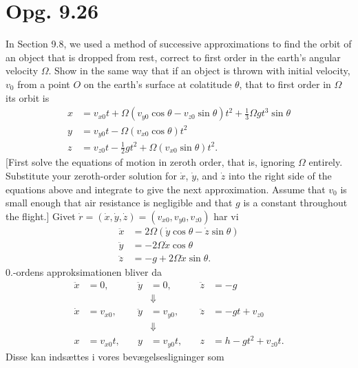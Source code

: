 \documentclass[12pt]{article}
\theoremstyle{definition}
\begin{document}
\section*{Opg. 9.26}
In Section 9.8, we used a method of successive approximations to find the orbit of an object that is dropped from rest, correct to first order in the earth's angular velocity $\Omega$. Show in the same way that if an object is thrown with initial velocity, $v_0$ from a point $O$ on the earth's surface at colatitude $\theta$, that to first order in $\Omega$ its orbit is
\begin{align*}
  x &= v_{x0}t + \Omega(v_{y0} \cos \theta - v_{z0} \sin\theta)t^2 + \frac{1}{3} \Omega gt^3 \sin \theta \\
  y &= v_{y0}t - \Omega(v_{x0} \cos \theta)t^2 \\
  z &= v_{z0}t - \frac{1}{2}gt^2 + \Omega(v_{x0} \sin \theta)t^2
.\end{align*}
[First solve the equations of motion in zeroth order, that is, ignoring $\Omega$ entirely. Substitute your zeroth-order solution for $\dot{x}$, $\dot{y}$, and $\dot{z}$ into the right side of the equations above and integrate to give the next approximation. Assume that $v_0$ is small enough that air resistance is negligible and that $g$ is a constant throughout the flight.]
\bigbreak
Givet $\dot{r} = (\dot{x}, \dot{y}, \dot{z}) = (v_{x0}, v_{y0}, v_{z0})$ har vi
\begin{align*}
  \ddot{x} &= 2\Omega(\dot{y} \cos \theta - \dot{z} \sin \theta) \\
  \ddot{y} &= -2\Omega \dot{x} \cos \theta \\
  \ddot{z} &= -g + 2\Omega \dot{x} \sin \theta
.\end{align*}
0.-ordens approksimationen bliver da
\begin{align*}
  \ddot{x} &= 0, &\quad \ddot{y} &= 0, &\quad \ddot{z} &= -g \\
  && &\Downarrow && \\
  \dot{x} &= v_{x0}, &\quad \ddot{y} &= v_{y0}, &\quad \ddot{z} &= -gt + v_{z0} \\
  && &\Downarrow && \\
  x &= v_{x0}t, &\quad y &= v_{y0}t, &\quad z &= h - gt^2 + v_{z0}t
.\end{align*}
Disse kan indsættes i vores bevægelsesligninger som
\end{document}
